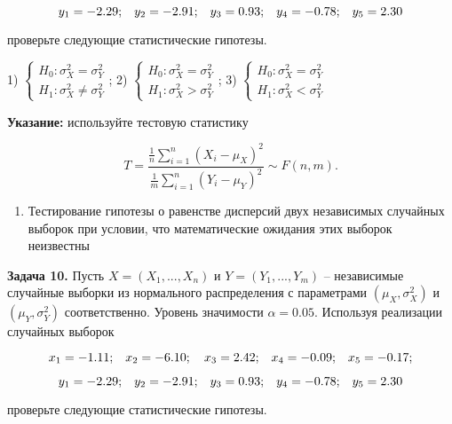 \[y_{1} =-{\rm 2.29;}\quad y_{2} =-{\rm 2.91;}\quad y_{3} =0.{\rm 93;}\quad y_{4} =-0.{\rm 78;}\quad y_{5} ={\rm 2.3}0\] 

проверьте следующие статистические гипотезы.

1) $\left\{\begin{array}{l} {H_{0} :\sigma _{X}^{2} =\sigma _{Y}^{2} } \\ {H_{1} :\sigma _{X}^{2} \ne \sigma _{Y}^{2} } \end{array}\right. $;             2) $\left\{\begin{array}{l} {H_{0} :\sigma _{X}^{2} =\sigma _{Y}^{2} } \\ {H_{1} :\sigma _{X}^{2} >\sigma _{Y}^{2} } \end{array}\right. $;             3) $\left\{\begin{array}{l} {H_{0} :\sigma _{X}^{2} =\sigma _{Y}^{2} } \\ {H_{1} :\sigma _{X}^{2} <\sigma _{Y}^{2} } \end{array}\right. $

\textbf{Указание:} используйте тестовую статистику

\[T=\frac{{\tfrac{1}{n}} \sum _{i=1}^{n}(X_{i} -\mu _{X} )^{2}  }{{\tfrac{1}{m}} \sum _{i=1}^{n}(Y_{i} -\mu _{Y} )^{2}  } \sim F(n,m).\] 



\begin{enumerate}
\item  Тестирование гипотезы о равенстве дисперсий двух независимых случайных выборок при условии, что математические ожидания этих выборок неизвестны 
\end{enumerate}



\textbf{Задача 10.} Пусть $X=\left(X_{1} ,...,X_{n} \right)$ и $Y=\left(Y_{1} ,...,Y_{m} \right)$ -- независимые случайные выборки из нормального распределения с параметрами $\left(\mu _{X} ,\sigma _{X}^{2} \right)$ и $\left(\mu _{Y} ,\sigma _{Y}^{2} \right)$ соответственно. Уровень значимости $\alpha =0.05$. Используя реализации случайных выборок 

\[x_{1} =-{\rm 1.11;}\quad x_{2} =-{\rm 6.1}0;\quad x_{3} ={\rm 2.42;}\quad x_{4} =-0.0{\rm 9;}\quad x_{5} =-0.{\rm 17;}\] 

\[y_{1} =-{\rm 2.29;}\quad y_{2} =-{\rm 2.91;}\quad y_{3} =0.{\rm 93;}\quad y_{4} =-0.{\rm 78;}\quad y_{5} ={\rm 2.3}0\] 

проверьте следующие статистические гипотезы.

